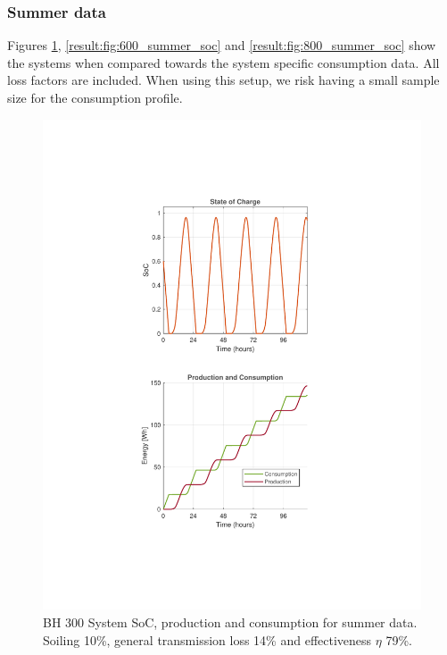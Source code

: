 \subsubsection{Summer data}
Figures \ref{result:fig:300_summer_soc}, \ref{result:fig:600_summer_soc} and \ref{result:fig:800_summer_soc} show the systems when compared towards the system specific consumption data. All loss factors are included. When using this setup, we risk having a small sample size for the consumption profile. 
\begin{minipage}[t]{0.32\textwidth} %
    \begin{figure}[H]
        \centering
        \includegraphics[width=\linewidth]{photos/Summer_SOC&Consumption_with_all_loss_5Days_300System.pdf} %
        \captionsetup{font=footnotesize} %
        \caption{BH 300 System SoC, production and consumption for summer data. Soiling 10\%, general transmission loss 14\% and effectiveness $\eta$ 79\%.}
        \label{result:fig:300_summer_soc}
    \end{figure}
\end{minipage}%
